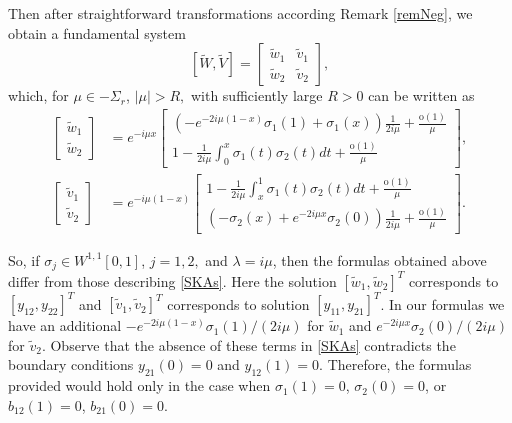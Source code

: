 \documentclass[11pt]{amsart}
\theoremstyle{plain}
\theoremstyle{definition}
\theoremstyle{remark}
\numberwithin{equation}{section}
\begin{document}
Then after straightforward transformations according  Remark \ref{remNeg}, we obtain
a fundamental system
\[
[\widetilde{W},\widetilde{V}]=\left[\begin{array}{cc}
\tilde{w}_1 & \tilde{v}_1\\
\tilde{w}_2 & \tilde{v}_2
\end{array}\right],
\]
which, for
$\mu\in -\Sigma_r$,
$|\mu|>R,$ with sufficiently large $R>0$ can be written as
\begin{align}\label{Int1A}
\left[\begin{array}{c}
\tilde{w}_1 \\
\tilde{w}_2
\end{array}\right]
&=e^{-i\mu x}\left[\begin{array}{c}
(-e^{-2i \mu (1-x)}\sigma_1(1)
 + \sigma_1(x))\frac{1}{2i\mu}+\frac{\mbox{o}(1)}{\mu}
\\
1-\frac{1}{2i\mu}
\int_0^x\sigma_1(t)
\sigma_2(t)dt +\frac{\mbox{o}(1)}{\mu}
\end{array}
\right],\\
\left[\begin{array}{c}
\tilde{v}_1 \\
\tilde{v}_2
\end{array}\right]
&=e^{-i \mu(1-x)}\left[
\begin{array}{c}
1-\frac{1}{2i\mu}
\int_x^1\sigma_1(t)
\sigma_2(t)dt+\frac{\mbox{o}(1)}{\mu}
\\
(-\sigma_2(x)+
e^{-2i \mu x}\sigma_2(0))\frac{1}{2i\mu}+\frac{\mbox{o}(1)}{\mu}
\end{array}\right].
\end{align}

So, if $\sigma_j\in W^{1,1}[0,1]$, $j=1,2,$ and $\lambda=i\mu$, then
the formulas obtained above differ from those describing \eqref{SKAs}.
Here the solution $[\tilde{w}_1,\tilde{w}_2]^T$ corresponds to
$[y_{12},y_{22}]^T$ and
$[\tilde{v}_1,\tilde{v}_2]^T$ corresponds to
solution $[y_{11},y_{21}]^T$.
In our formulas we have an additional
$-e^{-2i \mu (1-x)}\sigma_1(1)/(2i\mu)$
for $\tilde{w}_1$ and
$e^{-2i \mu x}\sigma_2(0)/(2i\mu)$
for $\tilde{v}_2$.
Observe that the absence of these terms in \eqref{SKAs} contradicts the boundary conditions
$y_{21}(0)=0$ and $y_{12}(1)=0$.
Therefore, the formulas provided would hold only in the case when
$\sigma_1(1)=0$, $\sigma_2(0)=0$, or $b_{12}(1)=0$, $b_{21}(0)=0$.
\end{document}
